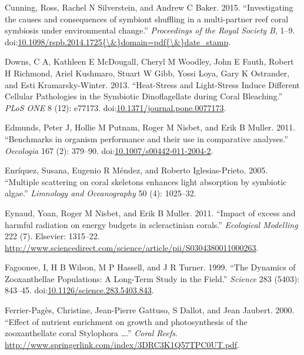 \documentclass[]{elsarticle} %
\begin{document}
\hypertarget{ref-Cunning:2015ja}{}
Cunning, Ross, Rachel N Silverstein, and Andrew C Baker. 2015.
``Investigating the causes and consequences of symbiont shuffling in a
multi-partner reef coral symbiosis under environmental change.''
\emph{Proceedings of the Royal Society B}, 1--9.
doi:\href{https://doi.org/10.1098/rspb.2014.1725\%7B/\&\%7Ddomain=pdf\%7B/\&\%7Ddate_stamp}{10.1098/rspb.2014.1725\{\textbackslash{}\&\}domain=pdf\{\textbackslash{}\&\}date\_stamp}.

\hypertarget{ref-Downs:2013kc}{}
Downs, C A, Kathleen E McDougall, Cheryl M Woodley, John E Fauth, Robert
H Richmond, Ariel Kushmaro, Stuart W Gibb, Yossi Loya, Gary K Ostrander,
and Esti Kramarsky-Winter. 2013. ``Heat-Stress and Light-Stress Induce
Different Cellular Pathologies in the Symbiotic Dinoflagellate during
Coral Bleaching.'' \emph{PLoS ONE} 8 (12): e77173.
doi:\href{https://doi.org/10.1371/journal.pone.0077173}{10.1371/journal.pone.0077173}.

\hypertarget{ref-Edmunds:2011bv}{}
Edmunds, Peter J, Hollie M Putnam, Roger M Nisbet, and Erik B Muller.
2011. ``Benchmarks in organism performance and their use in comparative
analyses.'' \emph{Oecologia} 167 (2): 379--90.
doi:\href{https://doi.org/10.1007/s00442-011-2004-2}{10.1007/s00442-011-2004-2}.

\hypertarget{ref-Enriquez:2005p142}{}
Enríquez, Susana, Eugenio R Méndez, and Roberto Iglesias-Prieto. 2005.
``Multiple scattering on coral skeletons enhances light absorption by
symbiotic algae.'' \emph{Limnology and Oceanography} 50 (4): 1025--32.

\hypertarget{ref-Eynaud:2011tv}{}
Eynaud, Yoan, Roger M Nisbet, and Erik B Muller. 2011. ``Impact of
excess and harmful radiation on energy budgets in scleractinian
corals.'' \emph{Ecological Modelling} 222 (7). Elsevier: 1315--22.
\url{http://www.sciencedirect.com/science/article/pii/S0304380011000263}.

\hypertarget{ref-Fagoonee:1999p4136}{}
Fagoonee, I, H B Wilson, M P Hassell, and J R Turner. 1999. ``The
Dynamics of Zooxanthellae Populations: A Long-Term Study in the Field.''
\emph{Science} 283 (5403): 843--45.
doi:\href{https://doi.org/10.1126/science.283.5403.843}{10.1126/science.283.5403.843}.

\hypertarget{ref-FerrierPages:2000p1950}{}
Ferrier-Pagès, Christine, Jean-Pierre Gattuso, S Dallot, and Jean
Jaubert. 2000. ``Effect of nutrient enrichment on growth and
photosynthesis of the zooxanthellate coral Stylophora \ldots{}.''
\emph{Coral Reefs}.
\url{http://www.springerlink.com/index/3DRC3K1Q57TPC0UT.pdf}.
\end{document}
